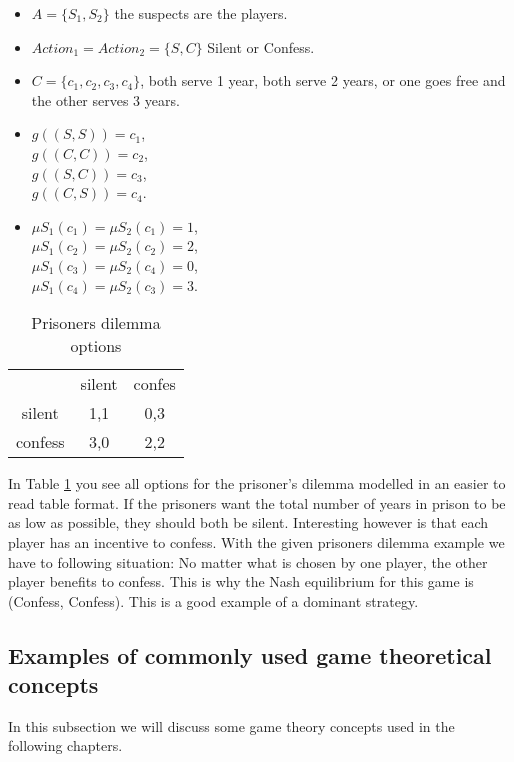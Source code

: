 \begin{itemize}
    \item $A = \{S_{1}, S_{2} \}$ the suspects are the players.
    \item $Action_{1} = Action_{2} = \{S, C\}$ Silent or Confess.
    \item $C = \{c_{1},c_{2},c_{3},c_{4}\}$, both serve 1 year, both serve 2 years, or one goes free and the other serves 3 years.
    \item $g((S,S)) = c_{1}$, \\
    $g((C,C)) = c_{2}$, \\
    $g((S,C)) = c_{3}$, \\
    $g((C,S)) = c_{4}$.
    \item $\mu S_{1}(c_{1}) = \mu S_{2}(c_{1}) = 1$, \\
    $\mu S_{1}(c_{2}) = \mu S_{2}(c_{2}) = 2$, \\
    $\mu S_{1}(c_{3}) = \mu S_{2}(c_{4}) = 0$, \\
    $\mu S_{1}(c_{4}) = \mu S_{2}(c_{3}) = 3$.
\end{itemize}

\begin{table}[h]
\centering
\begin{tabular}{ccc}
                             & silent                   & confes                   \\ \cline{2-3} 
\multicolumn{1}{c|}{silent}  & \multicolumn{1}{c|}{1,1} & \multicolumn{1}{c|}{0,3} \\ \cline{2-3} 
\multicolumn{1}{c|}{confess} & \multicolumn{1}{c|}{3,0} & \multicolumn{1}{c|}{2,2} \\ \cline{2-3} 
\end{tabular}
\caption{Prisoners dilemma options}
\label{prisoners-d}
\end{table}

In Table \ref{prisoners-d} you see all options for the prisoner's dilemma modelled in an easier to read table format. If the prisoners want the total number of years in prison to be as low as possible, they should both be silent. Interesting however is that each player has an incentive to confess. With the given prisoners dilemma example we have to following situation: No matter what is chosen by one player, the other player benefits to confess. This is why the Nash equilibrium for this game is (Confess, Confess). This is a good example of a dominant strategy. 

\subsection{Examples of commonly used game theoretical concepts}
In this subsection we will discuss some game theory concepts used in the following chapters. 

